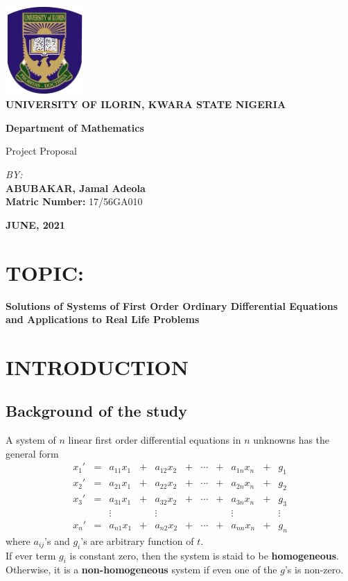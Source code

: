 \documentclass[12pt]{report}
\newcommand{\bt}[1]{\textbf{#1}}
\newcommand{\sps}{\\[0.2cm]}
\newcommand{\spn}[1]{\\[#1cm]}
\newcommand{\sprime}{'}
\newcommand{\tti}[1]{\textit{#1}}
\begin{document}
	\begin{titlepage}
		\centering
		\includegraphics[width=3cm]{unilorin_logo}\spn{.8}
		{\LARGE \bt{UNIVERSITY OF ILORIN, KWARA STATE NIGERIA}}\spn{0.5}
		
		\vspace{1cm}
		
		{\LARGE \bt{Department of Mathematics}}\spn{0.8}
		
		\vspace{1.3cm}
		
		{\Huge Project Proposal}\sps 
		\vspace{1cm}
		
		\tti{BY:}\sps
		\vspace{1cm}
		{\Large \bt{ABUBAKAR, Jamal Adeola}}
				\sps 
			\bt{Matric Number:} 17/56GA010
		
		\vspace{2.5cm}
		
		\bt{JUNE, 2021}
	\end{titlepage}

	\section*{TOPIC:}
	{\LARGE \bt{Solutions of Systems of First Order Ordinary Differential Equations and Applications to Real Life Problems}}
	
	\section*{INTRODUCTION}
	\subsection*{Background of the study}
	A system of $n$ linear first order differential equations in $n$ unknowns has the general form
	\begin{equation}
		\begin{array}{ccccccccccc}
			x_1\sprime &=& a_{11}x_1 &+ &a_{12}x_2 &+& \cdots &+& a_{1n}x_n &+& g_1 \sps
			x_2\sprime &=& a_{21}x_1 &+ &a_{22}x_2 &+& \cdots &+& a_{2n}x_n &+& g_2 \sps
			x_3\sprime &=& a_{31}x_1 &+ &a_{32}x_2 &+& \cdots &+& a_{3n}x_n &+& g_3 \sps
			 & & \vdots & & \vdots & &  & & \vdots & & \vdots \sps
			 x_n\sprime &=& a_{n1}x_1 &+ &a_{n2}x_2 &+& \cdots &+& a_{nn}x_n &+& g_n
		\end{array}
		\tag{*}
		\label{eq:astk_1}
	\end{equation}
	where $a_{ij}$'s and $g_i$'s are arbitrary function of $t$.\sps
	If ever term $g_i$ is constant zero, then the system is staid to be \bt{homogeneous}. Otherwise, it is a \bt{non-homogeneous} system if even one of the $g$'s is non-zero.\\
	
\end{document}
